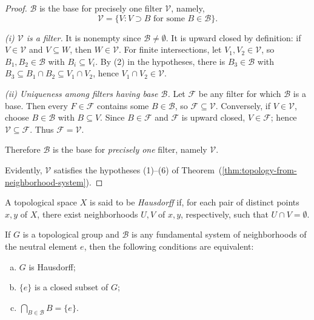 \begin{proof}
    \( \mathscr{B} \) is the base for precisely one filter \( \mathscr{V} \), namely,
    \[
        \mathscr{V} = \{ V : V \supset B \text{ for some } B \in \mathscr{B} \}.
    \]

    \emph{(i) $\mathscr{V}$ is a filter.}
    It is nonempty since $\mathscr{B}\neq\emptyset$. It is upward closed by definition:
    if $V\in\mathscr{V}$ and $V\subseteq W$, then $W\in\mathscr{V}$.
    For finite intersections, let $V_1,V_2\in\mathscr{V}$, so $B_1,B_2\in\mathscr{B}$ with
    $B_i\subseteq V_i$. By (2) in the hypotheses, there is $B_3\in\mathscr{B}$ with
    $B_3\subseteq B_1\cap B_2\subseteq V_1\cap V_2$, hence $V_1\cap V_2\in\mathscr{V}$.

    \emph{(ii) Uniqueness among filters having base $\mathscr{B}$.}
    Let $\mathscr{F}$ be any filter for which $\mathscr{B}$ is a base. Then every
    $F\in\mathscr{F}$ contains some $B\in\mathscr{B}$, so $\mathscr{F}\subseteq\mathscr{V}$.
    Conversely, if $V\in\mathscr{V}$, choose $B\in\mathscr{B}$ with $B\subseteq V$.
    Since $B\in\mathscr{F}$ and $\mathscr{F}$ is upward closed, $V\in\mathscr{F}$; hence
    $\mathscr{V}\subseteq\mathscr{F}$. Thus $\mathscr{F}=\mathscr{V}$.

    Therefore $\mathscr{B}$ is the base for \emph{precisely one} filter, namely $\mathscr{V}$.

    Evidently, \( \mathscr{V} \) satisfies the hypotheses (1)--(6) of Theorem~(\ref{thm:topology-from-neighborhood-system}).
\end{proof}

\begin{definition}
    \label{def:hausdorff-space}

    A topological space \( X \) is said to be \emph{Hausdorff} if, for each pair of distinct points \( x, y \) of \( X \), there exist neighborhoods \( U, V \) of \( x, y \), respectively, such that \( U \cap V = \emptyset \).
\end{definition}

\begin{theorem}
    If \( G \) is a topological group and \( \mathscr{B} \) is any fundamental system of neighborhoods of the neutral element \( e \), then the following conditions are equivalent:
    \begin{enumerate}[(a)]
        \item \( G \) is Hausdorff;
        \item \( \{ e \} \) is a closed subset of \( G \);
        \item \( \displaystyle \bigcap_{B \in \mathscr{B}} B = \{ e \} \).
    \end{enumerate}


\end{theorem}


